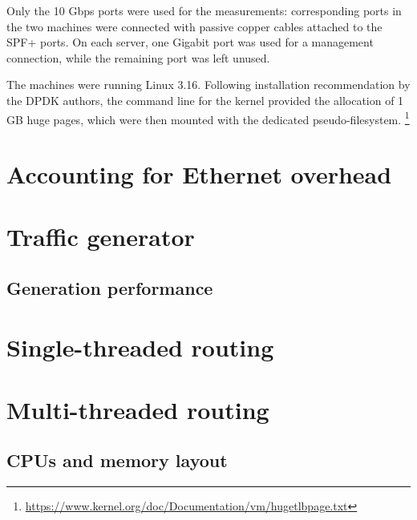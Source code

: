 \documentclass[12pt,a4paper,twoside]{book}
\begin{document}
Only the 10 Gbps ports were used for the measurements: corresponding ports in the two machines were connected with passive copper cables attached to the SPF+ ports. On each server, one Gigabit port was used for a management connection, while the remaining port was left unused.

The machines were running Linux 3.16. Following installation recommendation by the DPDK authors, the command line for the kernel provided the allocation of 1 GB huge pages, which were then mounted with the dedicated pseudo-filesystem.%
\footnote{\url{https://www.kernel.org/doc/Documentation/vm/hugetlbpage.txt}}



\section{Accounting for Ethernet overhead}\label{sec:test.overhead}

\section{Traffic generator}\label{sec:test.traffgen}

\subsection{Generation performance}

\section{Single-threaded routing}

\section{Multi-threaded routing}\label{sec:test.multicore}

\subsection{CPUs and memory layout}\label{sec:test.multicore.layout}
\end{document}
